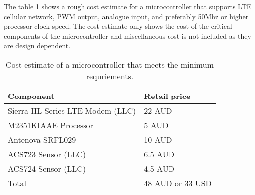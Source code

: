 \documentclass[../thesis.tex]{subfiles}
\begin{document}
The table \ref{tab:mcestimate} shows a rough cost estimate for a microcontroller that supports LTE cellular network, PWM output, analogue input, and preferably 50Mhz or higher processor clock speed. The cost estimate only shows the cost of the critical components of the microcontroller and miscellaneous cost is not included as they are design dependent.

\begin{table}[h!]
\begin{center}
\caption{Cost estimate of a microcontroller that meets the minimum requriements.}
\label{tab:mcestimate}
\begin{tabular}{l|l}
\toprule
\textbf{Component} & \textbf{Retail price}\\
\midrule
Sierra HL Series LTE Modem (LLC) & 22 AUD\\
M2351KIAAE Processor & 5 AUD\\
Antenova SRFL029 & 10 AUD\\
ACS723 Sensor (LLC) & 6.5 AUD\\
ACS724 Sensor (LLC) & 4.5 AUD\\
\midrule
Total & 48 AUD or 33 USD\\
\bottomrule
\end{tabular}
\end{center}
\end{table}
\end{document}
